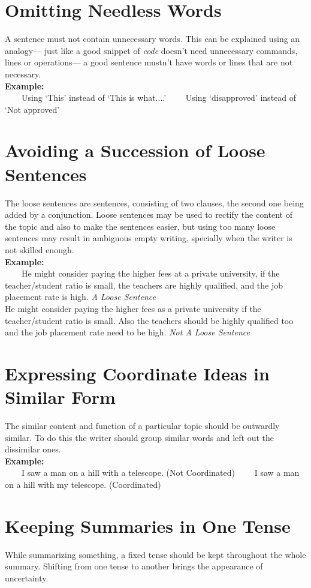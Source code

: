 \documentclass[12pt]{report}
\newcommand{\xmpl}{\textbf{Example:}\\} %
\newcommand{\indnt}{\ \ \ \ } %
\begin{document}
\section{Omitting Needless Words}
A sentence must not contain unnecessary words. This can be explained using an analogy--- just like a good snippet of \textit{code} doesn't need unnecessary commands, lines or operations--- a good sentence mustn't have words or lines that are not necessary.\\
\xmpl
\indnt Using `This' instead of `This is what....'
\indnt Using `disapproved' instead of `Not approved'\\


\section{Avoiding a Succession of Loose Sentences}
The loose sentences are sentences, consisting of two clauses, the second one being added by a conjunction. Loose sentences may be used to rectify the content of the topic and also to make the sentences easier, but using too many loose sentences may result in ambiguous empty writing, specially when the writer is not skilled enough.\\
\xmpl
\indnt He might consider paying the higher fees at a private university, if the teacher/student ratio is small, the teachers are highly qualified, and the job placement rate is high. \textit{A Loose Sentence}\\
He might consider paying the higher fees as a private university if the teacher/student ratio is small. Also the teachers should be highly qualified too and the job placement rate need to be high. \textit{Not A Loose Sentence}\\


\section{Expressing Coordinate Ideas in Similar Form}
The similar content and function of a particular topic should be outwardly similar. To do this the writer should group similar words and left out the dissimilar ones.\\
\xmpl
\indnt I saw a man on a hill with a telescope. (Not Coordinated)
\indnt I saw a man on a hill with my telescope. (Coordinated)\\


\section{Keeping Summaries in One Tense}
While summarizing something, a fixed tense should be kept throughout the whole summary. Shifting from one tense to another brings the appearance of uncertainty.
\end{document}
